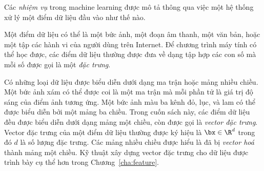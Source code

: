Các \textit{nhiệm vụ} trong machine learning được mô tả thông qua việc
một hệ thống xử lý một điểm dữ liệu đầu vào như thế nào. 

Một điểm dữ liệu có thể là một bức ảnh, một đoạn âm thanh, một văn bản, hoặc một
tập các hành vi của người dùng trên Internet. Để chương trình máy tính có thể
học được, các điểm dữ liệu thường được đưa về dạng tập hợp các con số mà mỗi số
được gọi là một \textit{đặc trưng}.


Có những loại dữ liệu được biểu diễn dưới dạng ma trận hoặc mảng nhiều chiều.
Một bức ảnh xám có thể được coi là một ma trận mà mỗi phần tử là giá trị độ sáng
của điểm ảnh tương ứng. Một bức ảnh màu ba kênh đỏ, lục, và lam có thể được biểu
diễn bởi một mảng ba chiều. Trong cuốn sách này, các điểm dữ liệu đều được biểu
diễn dưới dạng mảng một chiều, còn được gọi là \textit{vector đặc trưng}. Vector đặc trưng của một điểm dữ liệu thường được ký hiệu là $\bx \in \R^d$ trong đó $d$ là số lượng đặc trưng. Các mảng nhiều chiều được hiểu là đã bị \textit{vector hoá} thành mảng một chiều. Kỹ thuật xây dựng vector đặc trưng cho dữ liệu được trình bày cụ thể hơn trong Chương~\ref{cha:feature}.



